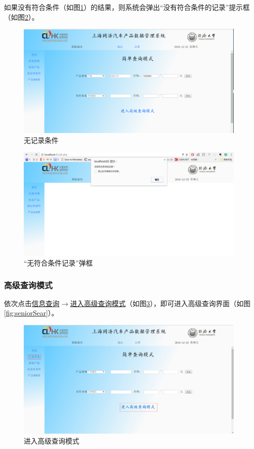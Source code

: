 如果没有符合条件（如图\ref{fig:noreulscond}）的结果，则系统会弹出``没有符合条件的记录''提示框（如图\ref{fig:noresult}）。
\begin{figure}[H]
\centering
\includegraphics[width=0.9\linewidth]{figure/noreulscond}
\caption{无记录条件}
\label{fig:noreulscond}
\end{figure}

\begin{figure}[H]
\centering
\includegraphics[width=0.9\linewidth]{figure/noresult}
\caption{``无符合条件记录''弹框}
\label{fig:noresult}
\end{figure}

\subsubsection{高级查询模式}
依次点击\underline{信息查询}$\to $\underline{进入高级查询模式}（如图\ref{fig:seniorSearInto_PxCook}），即可进入高级查询界面（如图\ref{fig:seniorSear}）。
\begin{figure}[H]
\centering
\includegraphics[width=0.9\linewidth]{figure/seniorSearInto_PxCook}
\caption{进入高级查询模式}
\label{fig:seniorSearInto_PxCook}
\end{figure}

